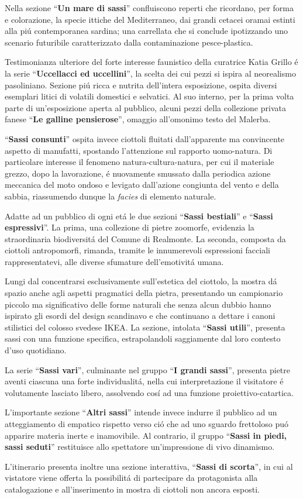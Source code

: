 \documentclass[
]{article}
\begin{document}
\Large
Nella sezione ``\textbf{Un mare di sassi}'' confluiscono reperti che
ricordano, per forma e colorazione, la specie ittiche del Mediterraneo,
dai grandi cetacei oramai estinti alla piú contemporanea sardina; una
carrellata che si conclude ipotizzando uno scenario futuribile
caratterizzato dalla contaminazione pesce-plastica.

Testimonianza ulteriore del forte interesse faunistico della curatrice
Katia Grillo é la serie ``\textbf{Uccellacci ed uccellini}'', la scelta
dei cui pezzi si ispira al neorealismo pasoliniano. Sezione piú ricca e
nutrita dell'intera esposizione, ospita diversi esemplari litici di
volatili domestici e selvatici. Al suo interno, per la prima volta parte
di un'esposizione aperta al pubblico, alcuni pezzi della collezione
privata fanese ``\textbf{Le galline pensierose}'', omaggio all'omonimo
testo del Malerba.

``\textbf{Sassi consunti}'' ospita invece ciottoli fluitati
dall'apparente ma convincente aspetto di manufatti, spostando
l'attenzione sul rapporto uomo-natura. Di particolare interesse il
fenomeno natura-cultura-natura, per cui il materiale grezzo, dopo la
lavorazione, é nuovamente smussato dalla periodica azione meccanica del
moto ondoso e levigato dall'azione congiunta del vento e della sabbia,
riassumendo dunque la \emph{facies} di elemento naturale.

Adatte ad un pubblico di ogni etá le due sezioni ``\textbf{Sassi
bestiali}'' e ``\textbf{Sassi espressivi}''. La prima, una collezione di
pietre zoomorfe, evidenzia la straordinaria biodiversitá del Comune di
Realmonte. La seconda, composta da ciottoli antropomorfi, rimanda,
tramite le innumerevoli espressioni facciali rappresentatevi, alle
diverse sfumature dell'emotivitá umana.

Lungi dal concentrarsi esclusivamente sull'estetica del ciottolo, la
mostra dá spazio anche agli aspetti pragmatici della pietra, presentando
un campionario piccolo ma significativo delle forme naturali che senza
alcun dubbio hanno ispirato gli esordi del design scandinavo e che
continuano a dettare i canoni stilistici del colosso svedese IKEA. La
sezione, intolata ``\textbf{Sassi utili}'', presenta sassi con una
funzione specifica, estrapolandoli saggiamente dal loro contesto d'uso
quotidiano.

La serie ``\textbf{Sassi vari}'', culminante nel gruppo ``\textbf{I
grandi sassi}'', presenta pietre aventi ciascuna una forte
individualitá, nella cui interpretazione il visitatore é volutamente
lasciato libero, assolvendo cosí ad una funzione proiettivo-catartica.

L'importante sezione ``\textbf{Altri sassi}'' intende invece indurre il
pubblico ad un atteggiamento di empatico rispetto verso ció che ad uno
sguardo frettoloso puó apparire materia inerte e inamovibile. Al
contrario, il gruppo ``\textbf{Sassi in piedi, sassi seduti}''
restituisce allo spettatore un'impressione di vivo dinamismo.

L'itinerario presenta inoltre una sezione interattiva, ``\textbf{Sassi di
scorta}'', in cui al vistatore viene offerta la possibilitá di
partecipare da protagonista alla catalogazione e all'inserimento in
mostra di ciottoli non ancora esposti.
\end{document}
